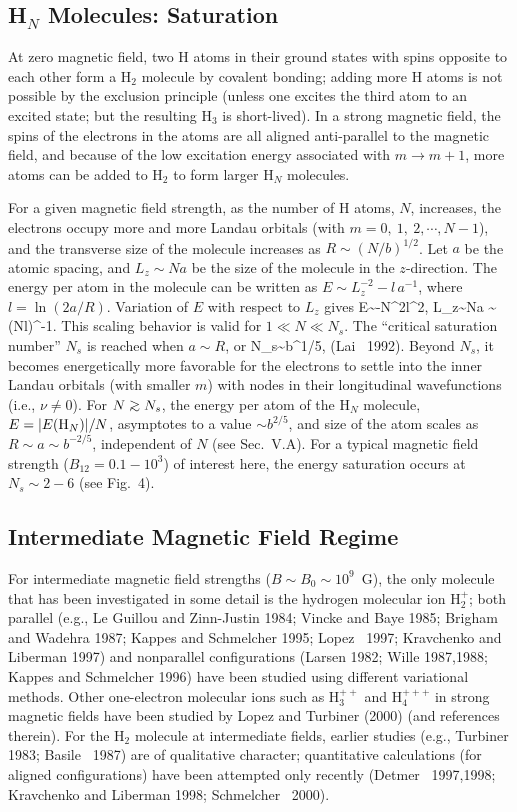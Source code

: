 \subsection{H$_N$ Molecules: Saturation}

At zero magnetic field, two H atoms in their ground states with spins 
opposite to each other form a H$_2$ molecule by covalent bonding;
adding more H atoms is not possible by the exclusion principle (unless
one excites the third atom to an excited state; but the resulting 
H$_3$ is short-lived). In a strong magnetic field,
the spins of the electrons in the atoms are all aligned anti-parallel to the
magnetic field, and because of the low excitation energy associated with
$m\rightarrow m+1$, more atoms can be added to H$_2$ to form larger
H$_N$ molecules. 

For a given magnetic field strength, as the number of H
atoms, $N$, increases, the electrons occupy more and more Landau orbitals
(with $m=0,~1,~2,\cdots,N-1$), and the transverse size of the molecule
increases as $R\sim (N/b)^{1/2}$. Let $a$ be the atomic spacing, and
$L_z\sim Na$ be the size of the molecule in the $z$-direction. 
The energy per atom in the molecule can be written as
$E\sim L_z^{-2}-l\,a^{-1}$, where $l=\ln (2a/R)$. 
Variation of $E$ with respect to $L_z$ gives 
\be
E\sim -N^2l^2,\qquad
L_z\sim Na \sim (Nl)^{-1}. 
\ee
This scaling behavior is valid for $1\ll N\ll N_s$.
The ``critical saturation number'' $N_s$ is reached when $a\sim R$, or
\be
N_s\sim b^{1/5},
\ee
(Lai \etal~1992). Beyond $N_s$, it becomes energetically more favorable
for the electrons to settle into the inner Landau orbitals (with smaller $m$)
with nodes in their longitudinal wavefunctions (i.e., $\nu\neq 0$). 
For $N\go N_s$, the energy per atom of the H$_N$ molecule,
$E=|E({\rm H}_N)|/N$, asymptotes to a value $\sim b^{2/5}$, 
and size of the atom scales as $R\sim a\sim b^{-2/5}$, independent of $N$
(see Sec.~V.A). For a typical magnetic field strength
($B_{12}=0.1-10^3$) of interest here, the energy saturation occurs
at $N_s\sim 2-6$ (see Fig.~4). 

\subsection{Intermediate Magnetic Field Regime}

For intermediate magnetic field strengths ($B\sim B_0\sim 10^9$~G), 
the only molecule that has been investigated in some detail is 
the hydrogen molecular ion H$_2^+$; both parallel (e.g., 
Le Guillou and Zinn-Justin 1984; Vincke and Baye 1985; 
Brigham and Wadehra 1987; Kappes and Schmelcher 
1995; Lopez \etal~1997;
Kravchenko and Liberman 1997) and nonparallel configurations (Larsen
1982; Wille 1987,1988; Kappes and Schmelcher 1996) have been studied using
different variational methods. 
Other one-electron molecular ions such as H$_3^{++}$ and H$_4^{+++}$
in strong magnetic fields have been studied by Lopez and Turbiner (2000)
(and references therein). For the H$_2$ molecule at intermediate fields,
earlier studies (e.g., Turbiner 1983; Basile \etal~1987) are of
qualitative character; quantitative calculations (for aligned
configurations) have been attempted only recently (Detmer \etal~1997,1998;
Kravchenko and Liberman 1998; Schmelcher \etal~2000). 

